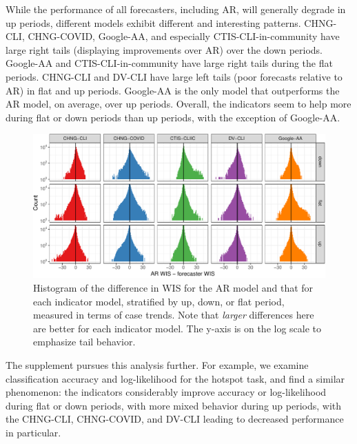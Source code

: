 \documentclass[9pt,twocolumn,twoside,lineno]{pnas-new}
\begin{document}
While the performance of all forecasters, including AR, will generally degrade
in up periods, different models exhibit different and interesting patterns.
CHNG-CLI, CHNG-COVID, Google-AA, and especially CTIS-CLI-in-community have
large right tails (displaying improvements over AR) over the down periods.
Google-AA and CTIS-CLI-in-community have large right tails during the flat
periods. CHNG-CLI and DV-CLI have large left tails (poor forecasts relative to
AR) in flat and up periods.  Google-AA is the only model that outperforms
the AR model, on average, over up periods.  Overall, the indicators seem to help
more during flat or down periods than up periods, with the exception of
Google-AA.    

\begin{figure}[t]
  \includegraphics[width=\textwidth]{fig/upswing-histogram-1.pdf}
  \caption{Histogram of the difference in WIS for the AR model and that for each
    indicator model, stratified by up, down, or flat period, measured in terms
    of case trends. Note that \textit{larger} differences here are better for
    each indicator model.  The y-axis is on the log scale to emphasize tail 
    behavior.}   
  \label{fig:up_down_flat}
\end{figure}

The supplement pursues this analysis further.  For example, we examine
classification accuracy and log-likelihood for the hotspot task, and find a
similar phenomenon: the indicators considerably improve accuracy or
log-likelihood during flat or down periods, with more mixed behavior during up
periods, with the CHNG-CLI, CHNG-COVID, and DV-CLI leading to decreased
performance in particular.

\end{document}
